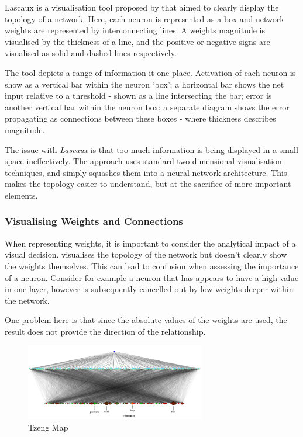 \documentclass[a4paper,11pt,titlepage]{article}
\begin{document}
		Lascaux is a visualisation tool proposed by \cite{Craven1992} that aimed to clearly display the topology of a network. Here, each neuron is represented as a box and network weights are represented by interconnecting lines. A weights magnitude is visualised by the thickness of a line, and the positive or negative signs are visualised as solid and dashed lines respectively.
		\par 
		The tool depicts a range of information it one place. Activation of each neuron is show as a vertical bar within the neuron `box'; a horizontal bar shows the net input relative to a threshold - shown as a line intersecting the bar; error is another vertical bar within the neuron box; a separate diagram shows the error propagating as connections between these boxes - where thickness describes magnitude.
		\par 
		The issue with \textit{Lascaux} is that too much information is being displayed in a small space ineffectively. The approach uses standard two dimensional visualisation techniques, and simply squashes them into a neural network architecture. This makes the topology easier to understand, but at the sacrifice of more important elements.

\subsubsection{Visualising Weights and Connections}
		When representing weights, it is important to consider the analytical impact of a visual decision. \cite{Streeter2001} visualises the topology of the network but doesn't clearly show the weights themselves. This can lead to confusion when assessing the importance of a neuron. Consider for example a neuron that has appears to have a high value in one layer, however is subsequently cancelled out by low weights deeper within the network.
	\par 
	One problem here is that since the absolute values of the weights are used, the result does not provide the direction of the relationship. 
	\par 
		
	\begin{figure}[H]
		\centering 
    		\includegraphics[width=0.7\textwidth]{img/tzeng_large_map.png} 
    		\caption{Tzeng Map}%
 	\end{figure}
 	
\end{document}
